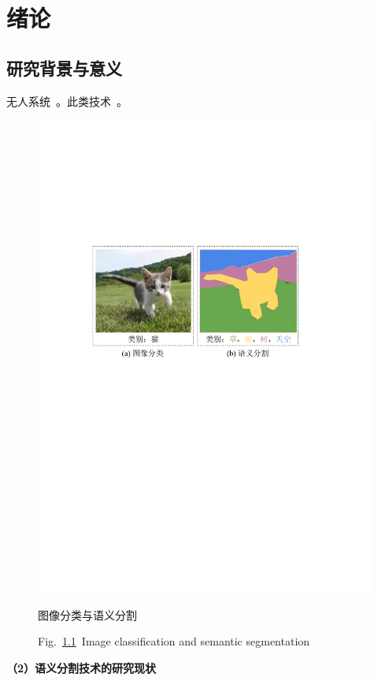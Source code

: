 \chapter{绪论}
\label{cha:intro}

\section{研究背景与意义}

无人系统~\cite{ZGJX201517001}。此类技术~\cite{stampa2021maturity}。
\begin{figure}[!htb] 
    \centering
    \includegraphics[width=0.66\linewidth]{figures/c01/Fig1.pdf}
    \caption{图像分类与语义分割}
    \vspace{-4mm}
    \caption*{Fig.~\ref{fig_01_01}~Image classification and semantic segmentation}
    \label{fig_01_01}
\end{figure}

\songti\textbf{（2）语义分割技术的研究现状}
